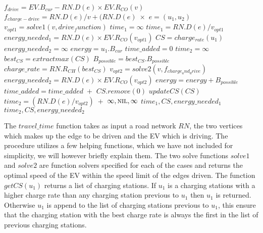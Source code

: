 \begin{algorithm}[!htb]
 \begin{algorithmic}[1]
    \State $f_{drive} = EV.B_{cur}-RN.D(e)\times EV.R_{CO}(v)$
    \State $f_{charge-drive} = RN.D(e)/v + (RN.D(e)\; \times$
  	\State $e = (u_1, u_2)$
  	\State $v_{opt1} = solve1(v, drive_function)$
  		\State $time_1 = \infty$
  	\Else
 		\State $time_1 = RN.D(e) / v_{opt1}$
 		\State $energy\_needed_{1} = RN.D(e)\times EV.R_{CO}(v_{opt1})$
  	\EndIf
		\State $CS = charge_{rate}(u_1)$ 
  		\State $energy\_needed_{2} = \infty$
  		\State $energy = u_1.B_{cur}$
  		\State $time\_added = 0$
  		\State $time_2 = \infty$
  		\State $best_{CS} = extractmax(CS)$
  		\State $B_{possible} = best_{CS}.B_{possible}$
  		\State $charge\_rate = RN.R_{CH}(best_{CS})$
  		\State $v_{opt2} = solve2 (v, f_{charge_and_drive})$ 
  		\State $energy\_needed_{2} = RN.D(e)\times EV.R_{CO}(v_{opt2})$
  		\State $energy = energy + B_{possible}$
  			\State $time\_added = time\_added\; +$
  			\State $CS.remove(0)$
  			\State $updateCS(CS)$
  		\EndIf	
  	\EndWhile
  		\State $time_2 = (RN.D(e)/v_{opt2})\; +$ 
  	\EndIf
  		\State \Return $\infty, \textsc{nil}, \infty$
  	\EndIf
  		\State \Return $time_1, CS, energy\_needed_1$
  	\Else
  		\State \Return $time_2, CS, energy\_needed_2$
  	\EndIf
  \EndFunction
  \end{algorithmic}\label{alg:fastest_path}
\end{algorithm}

The $travel\_time$ function takes as input a road network $RN$, the two vertices which makes up the edge to be driven and the EV which is driving. The procedure utilizes a few helping functions, which we have not included for simplicity, we will however briefly explain them. The two solve functions $solve1$ and $solve2$ are function solvers specified for each of the cases and returns the optimal speed of the EV within the speed limit of the edges driven. The function $getCS(u_1)$ returns a list of charging stations. If $u_1$ is a charging stations with a higher charge rate than any charging station previous to $u_1$ then $u_1$ is returned. Otherwise $u_1$ is append to the list of charging stations previous to $u_1$, this ensure that the charging station with the best charge rate is always the first in the list of previous charging stations. 

